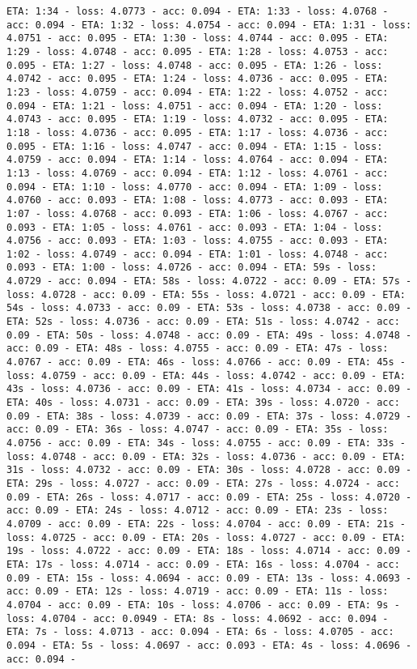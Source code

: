 \documentclass[11pt]{article}
\begin{document}
\begin{Verbatim}[commandchars=\\\{\}]
ETA: 1:34 - loss: 4.0773 - acc: 0.094 - ETA: 1:33 - loss: 4.0768 - acc: 0.094 - ETA: 1:32 - loss: 4.0754 - acc: 0.094 - ETA: 1:31 - loss: 4.0751 - acc: 0.095 - ETA: 1:30 - loss: 4.0744 - acc: 0.095 - ETA: 1:29 - loss: 4.0748 - acc: 0.095 - ETA: 1:28 - loss: 4.0753 - acc: 0.095 - ETA: 1:27 - loss: 4.0748 - acc: 0.095 - ETA: 1:26 - loss: 4.0742 - acc: 0.095 - ETA: 1:24 - loss: 4.0736 - acc: 0.095 - ETA: 1:23 - loss: 4.0759 - acc: 0.094 - ETA: 1:22 - loss: 4.0752 - acc: 0.094 - ETA: 1:21 - loss: 4.0751 - acc: 0.094 - ETA: 1:20 - loss: 4.0743 - acc: 0.095 - ETA: 1:19 - loss: 4.0732 - acc: 0.095 - ETA: 1:18 - loss: 4.0736 - acc: 0.095 - ETA: 1:17 - loss: 4.0736 - acc: 0.095 - ETA: 1:16 - loss: 4.0747 - acc: 0.094 - ETA: 1:15 - loss: 4.0759 - acc: 0.094 - ETA: 1:14 - loss: 4.0764 - acc: 0.094 - ETA: 1:13 - loss: 4.0769 - acc: 0.094 - ETA: 1:12 - loss: 4.0761 - acc: 0.094 - ETA: 1:10 - loss: 4.0770 - acc: 0.094 - ETA: 1:09 - loss: 4.0760 - acc: 0.093 - ETA: 1:08 - loss: 4.0773 - acc: 0.093 - ETA: 1:07 - loss: 4.0768 - acc: 0.093 - ETA: 1:06 - loss: 4.0767 - acc: 0.093 - ETA: 1:05 - loss: 4.0761 - acc: 0.093 - ETA: 1:04 - loss: 4.0756 - acc: 0.093 - ETA: 1:03 - loss: 4.0755 - acc: 0.093 - ETA: 1:02 - loss: 4.0749 - acc: 0.094 - ETA: 1:01 - loss: 4.0748 - acc: 0.093 - ETA: 1:00 - loss: 4.0726 - acc: 0.094 - ETA: 59s - loss: 4.0729 - acc: 0.094 - ETA: 58s - loss: 4.0722 - acc: 0.09 - ETA: 57s - loss: 4.0728 - acc: 0.09 - ETA: 55s - loss: 4.0721 - acc: 0.09 - ETA: 54s - loss: 4.0733 - acc: 0.09 - ETA: 53s - loss: 4.0738 - acc: 0.09 - ETA: 52s - loss: 4.0736 - acc: 0.09 - ETA: 51s - loss: 4.0742 - acc: 0.09 - ETA: 50s - loss: 4.0748 - acc: 0.09 - ETA: 49s - loss: 4.0748 - acc: 0.09 - ETA: 48s - loss: 4.0755 - acc: 0.09 - ETA: 47s - loss: 4.0767 - acc: 0.09 - ETA: 46s - loss: 4.0766 - acc: 0.09 - ETA: 45s - loss: 4.0759 - acc: 0.09 - ETA: 44s - loss: 4.0742 - acc: 0.09 - ETA: 43s - loss: 4.0736 - acc: 0.09 - ETA: 41s - loss: 4.0734 - acc: 0.09 - ETA: 40s - loss: 4.0731 - acc: 0.09 - ETA: 39s - loss: 4.0720 - acc: 0.09 - ETA: 38s - loss: 4.0739 - acc: 0.09 - ETA: 37s - loss: 4.0729 - acc: 0.09 - ETA: 36s - loss: 4.0747 - acc: 0.09 - ETA: 35s - loss: 4.0756 - acc: 0.09 - ETA: 34s - loss: 4.0755 - acc: 0.09 - ETA: 33s - loss: 4.0748 - acc: 0.09 - ETA: 32s - loss: 4.0736 - acc: 0.09 - ETA: 31s - loss: 4.0732 - acc: 0.09 - ETA: 30s - loss: 4.0728 - acc: 0.09 - ETA: 29s - loss: 4.0727 - acc: 0.09 - ETA: 27s - loss: 4.0724 - acc: 0.09 - ETA: 26s - loss: 4.0717 - acc: 0.09 - ETA: 25s - loss: 4.0720 - acc: 0.09 - ETA: 24s - loss: 4.0712 - acc: 0.09 - ETA: 23s - loss: 4.0709 - acc: 0.09 - ETA: 22s - loss: 4.0704 - acc: 0.09 - ETA: 21s - loss: 4.0725 - acc: 0.09 - ETA: 20s - loss: 4.0727 - acc: 0.09 - ETA: 19s - loss: 4.0722 - acc: 0.09 - ETA: 18s - loss: 4.0714 - acc: 0.09 - ETA: 17s - loss: 4.0714 - acc: 0.09 - ETA: 16s - loss: 4.0704 - acc: 0.09 - ETA: 15s - loss: 4.0694 - acc: 0.09 - ETA: 13s - loss: 4.0693 - acc: 0.09 - ETA: 12s - loss: 4.0719 - acc: 0.09 - ETA: 11s - loss: 4.0704 - acc: 0.09 - ETA: 10s - loss: 4.0706 - acc: 0.09 - ETA: 9s - loss: 4.0704 - acc: 0.0949 - ETA: 8s - loss: 4.0692 - acc: 0.094 - ETA: 7s - loss: 4.0713 - acc: 0.094 - ETA: 6s - loss: 4.0705 - acc: 0.094 - ETA: 5s - loss: 4.0697 - acc: 0.093 - ETA: 4s - loss: 4.0696 - acc: 0.094 - 
\end{Verbatim}
\end{document}
